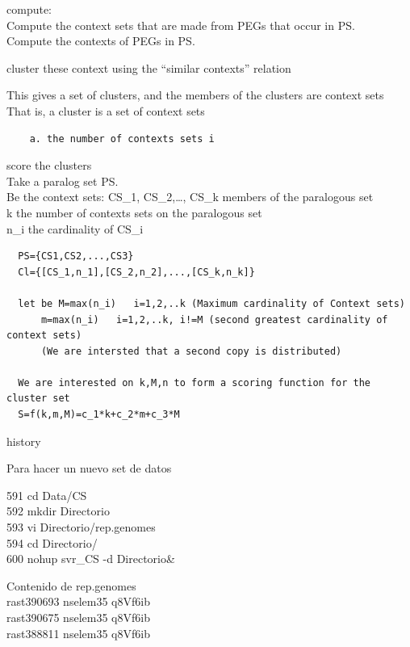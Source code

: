 \documentclass[12pt,twoside]{reedthesis}
\begin{document}
  compute:\\
   Compute the context sets that are made from PEGs that occur in PS.\\
   Compute the contexts of PEGs in PS.
  
  cluster these context using the ``similar contexts'' relation
  
  This gives a set of clusters, and the members of the clusters are
  context sets\\
  That is, a cluster is a set of context sets
  
  \begin{verbatim}
    a. the number of contexts sets i  
  \end{verbatim}
  
  score the clusters\\
   Take a paralog set PS.\\
   Be the context sets: CS\_1, CS\_2,\ldots{}, CS\_k members of the
  paralogous set\\
   k the number of contexts sets on the paralogous set\\
   n\_i the cardinality of CS\_i
  
  \begin{verbatim}
  PS={CS1,CS2,...,CS3}  
  Cl={[CS_1,n_1],[CS_2,n_2],...,[CS_k,n_k]}  
  
  let be M=max(n_i)   i=1,2,..k (Maximum cardinality of Context sets)  
      m=max(n_i)   i=1,2,..k, i!=M (second greatest cardinality of context sets)  
      (We are intersted that a second copy is distributed)  
  
  We are interested on k,M,n to form a scoring function for the cluster set  
  S=f(k,m,M)=c_1*k+c_2*m+c_3*M  
  \end{verbatim}
  
  history
  
  Para hacer un nuevo set de datos
  
  591 cd Data/CS\\
   592 mkdir Directorio\\
   593 vi Directorio/rep.genomes\\
   594 cd Directorio/\\
   600 nohup svr\_CS -d Directorio\&
  
  Contenido de rep.genomes\\
  rast\textbar{}390693 nselem35 q8Vf6ib\\
  rast\textbar{}390675 nselem35 q8Vf6ib\\
  rast\textbar{}388811 nselem35 q8Vf6ib
  
\end{document}
